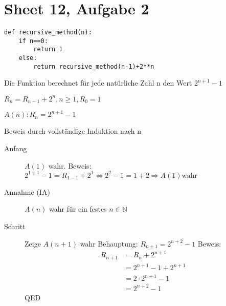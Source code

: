 \documentclass[11pt]{article}
\author{Aaron}
\date{\today}
\title{}
\begin{document}
\section{Sheet 12, Aufgabe 2}
\label{sec:org75b4ba5}
\begin{verbatim}
def recursive_method(n):
    if n==0:
        return 1
    else:
        return recursive_method(n-1)+2**n
\end{verbatim}

\begin{description}
\item[{Behauptung}] Die Funktion berechnet für jede natürliche Zahl n den Wert \(2^{n+1}-1\)
\item[{Umschreiben als rekursive Gleichung}] \(R_n = R_{n-1}+2^n, n \geq 1 ,R_0 = 1\)
\item[{Behauptung}] \(A(n) : R_n = 2^{n+1} -1\)
\item Beweis durch vollständige Induktion nach n
\begin{description}
\item[{Anfang}] \(A(1)\) wahr.
Beweis: \(2^{1+1} -1 = R_{1-1} + 2^1 \Leftrightarrow 2^{2}-1 = 1+2 \Rightarrow A(1) \text{wahr}\)
\item[{Annahme (IA)}] \(A(n)\) wahr für ein festes \(n\in \mathbb{N}\)
\item[{Schritt}] Zeige \(A(n+1)\) wahr
Behauptung: \(R_{n+1} = 2^{n+2}-1\)
Beweis: 
\begin{eqnarray*}
R_{n+1} & = R_n + 2^{n+1}\\
	& = 2^{n+1} -1 + 2^{n+1}\\
	& = 2\cdot 2^{n+1} -1 \\
	& = 2^{n+2} -1
\end{eqnarray*} QED
\end{description}
\end{description}
\end{document}
